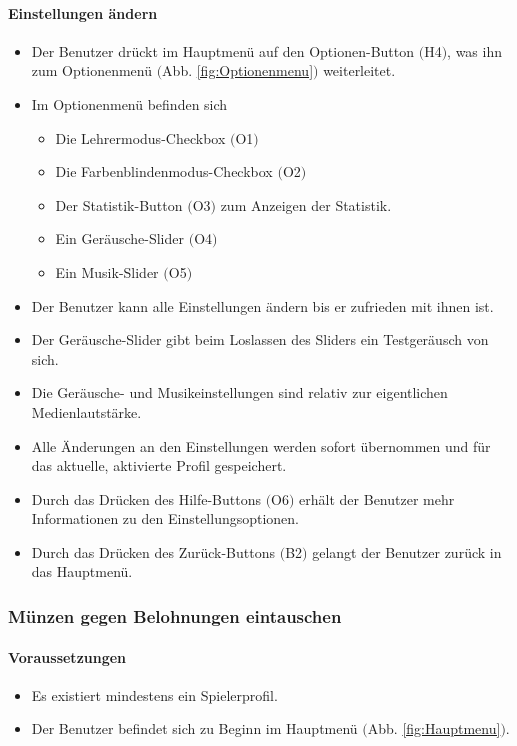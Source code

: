 \paragraph{Einstellungen ändern}
\begin{itemize}
	\item Der Benutzer drückt im Hauptmenü auf den Optionen-Button $($H4$)$, was ihn zum Optionenmenü $($Abb. \ref{fig:Optionenmenu}$)$ weiterleitet.
	\item Im Optionenmenü befinden sich
	\begin{itemize}
		\item Die Lehrermodus-Checkbox $($O1$)$
		\item Die Farbenblindenmodus-Checkbox $($O2$)$
		\item Der Statistik-Button $($O3$)$ zum Anzeigen der Statistik.
		\item Ein Geräusche-Slider $($O4$)$
		\item Ein Musik-Slider $($O5$)$
	\end{itemize}
	\item Der Benutzer kann alle Einstellungen ändern bis er zufrieden mit ihnen ist.
	\item Der Geräusche-Slider gibt beim Loslassen des Sliders ein Testgeräusch von sich.
	\item Die Geräusche- und Musikeinstellungen sind relativ zur eigentlichen Medienlautstärke.
	\item Alle Änderungen an den Einstellungen werden sofort übernommen und für das aktuelle, aktivierte Profil gespeichert.
	\item Durch das Drücken des Hilfe-Buttons $($O6$)$ erhält der Benutzer mehr Informationen zu den Einstellungsoptionen.
	\item Durch das Drücken des Zurück-Buttons $($B2$)$ gelangt der Benutzer zurück in das Hauptmenü.
\end{itemize}

\subsubsection{Münzen gegen Belohnungen eintauschen}
\paragraph{Voraussetzungen}
\begin{itemize}
	\item Es existiert mindestens ein Spielerprofil.
	\item Der Benutzer befindet sich zu Beginn im Hauptmenü $($Abb. \ref{fig:Hauptmenu}$)$.
\end{itemize}

